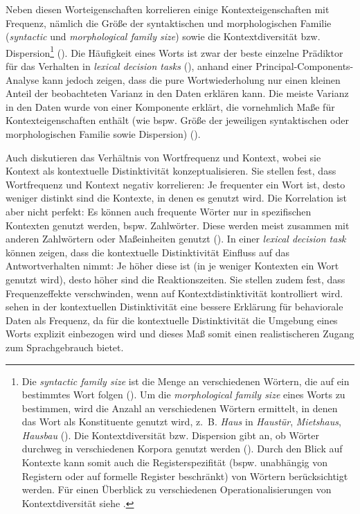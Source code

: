 Neben diesen Worteigenschaften korrelieren einige Kontexteigenschaften mit Frequenz, nämlich die Größe der syntaktischen und morphologischen Familie (\textit{syntactic} und \textit{morphological family size}) sowie die Kontextdiversität bzw. Dispersion\footnote{Die \textit{syntactic family size} ist die Menge an verschiedenen Wörtern, die auf ein bestimmtes Wort folgen (\cite[176]{Baayen.2012}). Um die \textit{morphological family size} eines Worts zu bestimmen, wird die Anzahl an verschiedenen Wörtern ermittelt, in denen das Wort als Konstituente genutzt wird, z.~B. \textit{Haus} in \textit{Haustür}, \textit{Mietshaus}, \textit{Hausbau} (\cite[177]{Baayen.2012}). Die Kontextdiversität bzw. Dispersion gibt an, ob Wörter durchweg in verschiedenen Korpora genutzt werden (\cite[175]{Baayen.2012}). Durch den Blick auf Kontexte kann somit auch die Registerspezifität (bspw. unabhängig von Registern oder auf formelle Register beschränkt) von Wörtern berücksichtigt werden. Für einen Überblick zu verschiedenen Operationalisierungen von Kontextdiversität siehe \textcite[58--60]{Divjak.2015}.} (\cite[189--191]{Baayen.2012}). Die Häufigkeit eines Worts ist zwar der beste einzelne Prädiktor für das Verhalten in \textit{lexical decision tasks} (\cite[178--179]{Baayen.2012}), anhand einer Principal-Components-Analyse kann \textcite[181--191]{Baayen.2012} jedoch zeigen, dass die pure Wortwiederholung nur einen kleinen Anteil der beobachteten Varianz in den Daten erklären kann. Die meiste Va\-rianz in den Daten wurde von einer Komponente erklärt, die vornehmlich Maße für Kontext\-eigenschaften enthält (wie bspw. Größe der jeweiligen syntaktischen oder morphologischen Familie sowie Dispersion) (\cite[191]{Baayen.2012}). 



Auch \textcite[308]{McDonald.2001} diskutieren das Verhältnis von Wortfrequenz und Kontext, wobei sie Kontext als kontextuelle Distinktivität konzeptualisieren. Sie stellen fest, dass Wortfrequenz und Kontext negativ korrelieren: Je frequenter ein Wort ist, desto weniger distinkt sind die Kontexte, in denen es genutzt wird. Die Korrelation ist aber nicht perfekt: Es können auch frequente Wörter nur in spezifischen Kontexten genutzt werden, bspw. Zahlwörter. Diese werden meist zusammen mit anderen Zahlwörtern oder Maßeinheiten genutzt (\cite[301]{McDonald.2001}). In einer \textit{lexical decision task} können \textcite[310--312]{McDonald.2001} zeigen, dass die kontextuelle Distinktivität Einfluss auf das Antwortverhalten nimmt: Je höher diese ist (in je weniger Kontexten ein Wort genutzt wird), desto höher sind die Reaktionszeiten. Sie stellen zudem fest, dass Frequenzeffekte verschwinden, wenn auf Kontextdistinktivität kontrolliert wird. \textcite[318--319]{McDonald.2001} sehen in der kontextuellen Distinktivität eine bessere Erklärung für behaviorale Daten als Frequenz, da für die kontextuelle Distinktivität die Umgebung eines Worts explizit einbezogen wird und dieses Maß somit einen realistischeren Zugang zum Sprachgebrauch bietet. 

